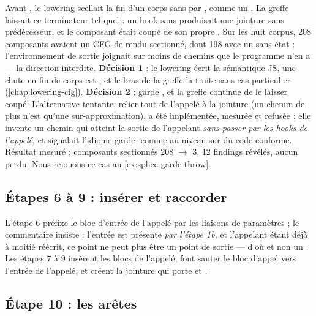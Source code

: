 \begin{decision}
Avant , le lowering scellait la fin d'un corps sans  par , comme un . La greffe laissait ce terminateur tel quel : un hook sans  produisait une jointure sans prédécesseur, et le composant était coupé de son propre . Sur les huit corpus, 208 composants avaient un CFG de rendu sectionné, dont 198 avec un  sans état : l'environnement de sortie joignait sur moins de chemins que le programme n'en a --- la direction interdite. \textbf{Décision 1} : le lowering écrit la sémantique JS, une chute en fin de corps est , et le bras  de la greffe la traite sans cas particulier (\cref{chap:lowering-cfg}). \textbf{Décision 2} :  garde , et la greffe continue de le laisser coupé. L'alternative tentante, relier tout  de l'appelé à la jointure (\og un chemin de plus n'est qu'une sur-approximation\fg{}), a été implémentée, mesurée et refusée : elle invente un chemin qui atteint la sortie de l'appelant \emph{sans passer par les hooks de l'appelé}, et signalait l'idiome garde- comme  au niveau \Error{} sur du code conforme. Résultat mesuré : composants sectionnés 208 $\to$ 3, 12 findings révélés, aucun perdu. Nous rejouons ce cas au \cref{ex:splice-garde-throw}.
\end{decision}

\subsection{Étapes 6 à 9 : insérer et raccorder}


L'étape 6 préfixe le bloc d'entrée de l'appelé par les liaisons de paramètres ; le commentaire insiste : l'entrée est présente \emph{par l'étape 1b}, et l'appelant étant déjà à moitié réécrit, ce point ne peut plus être un point de sortie --- d'où  et non un . Les étapes 7 à 9 insèrent les blocs de l'appelé, font sauter le bloc d'appel vers l'entrée de l'appelé, et créent la jointure qui porte  et .

\subsection{Étape 10 : les arêtes}

